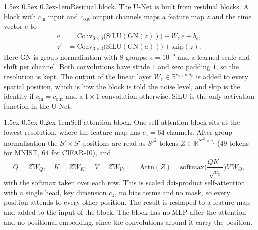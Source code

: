 \documentclass{article}
\makeatletter
\renewcommand{\normalsize}{\fontsize{10pt}{11pt}\selectfont}
\renewcommand{\paragraph}{\@startsection{paragraph}{4}{\z@}%
  {1.5ex \@plus 0.5ex \@minus 0.2ex}{-1em}{\normalsize\bfseries}}
\theoremstyle{remark}
\newcommand{\R}{\mathbb{R}}
\makeatother
\begin{document}
\paragraph{Residual block.} The U-Net is built from residual blocks. A block with $c_{\mathrm{in}}$ input and $c_{\mathrm{out}}$ output channels maps a feature map $z$ and the time vector $e$ to
\begin{align*}
  a&= \mathrm{Conv}_{3 \times 3}\big(\mathrm{SiLU}(\mathrm{GN}(z))\big) + W_e\,e + b_e,\\
  z'&= \mathrm{Conv}_{3 \times 3}\big(\mathrm{SiLU}(\mathrm{GN}(a))\big) + \mathrm{skip}(z).
\end{align*}
Here $\mathrm{GN}$ is group normalisation \citep{wu2018groupnorm} with $8$ groups, $\epsilon = 10^{-5}$ and a learned scale and shift per channel. Both convolutions have stride $1$ and zero padding $1$, so the resolution is kept. The output of the linear layer $W_e \in \R^{c_{\mathrm{out}} \times d_e}$ is added to every spatial position, which is how the block is told the noise level, and $\mathrm{skip}$ is the identity if $c_{\mathrm{in}} = c_{\mathrm{out}}$ and a $1 \times 1$ convolution otherwise. SiLU is the only activation function in the U-Net.

\paragraph{Self-attention block.} One self-attention block sits at the lowest resolution, where the feature map has $c_z = 64$ channels. After group normalisation the $S' \times S'$ positions are read as $S'^2$ tokens $Z \in \R^{S'^2 \times c_z}$ ($49$ tokens for MNIST, $64$ for CIFAR-10), and
$$
  Q = ZW_Q,\quad K = ZW_K,\quad V = ZW_V,\qquad
  \mathrm{Attn}(Z) = \mathrm{softmax}\Big(\frac{QK^\top}{\sqrt{c_z}}\Big)V\,W_O,
$$
with the softmax taken over each row. This is scaled dot-product self-attention \citep{vaswani2017attention} with a single head, key dimension $c_z$, no bias terms and no mask, so every position attends to every other position. The result is reshaped to a feature map and added to the input of the block. The block has no MLP after the attention and no positional embedding, since the convolutions around it carry the position.
\end{document}
